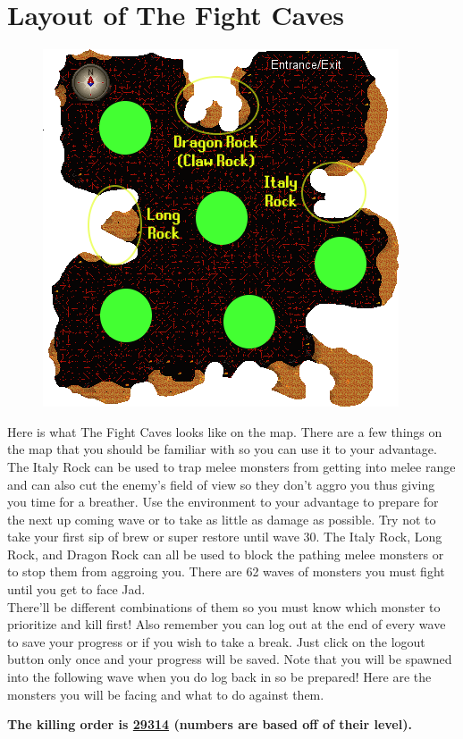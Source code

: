 \documentclass{article}
\begin{document}
\section{Layout of The Fight Caves}
\begin{figure}
\includegraphics[width=.6\textwidth]{Fight_Caves_Map.png}
\end{figure}
Here is what The Fight Caves looks like on the map. There are a few things on the map that you should be familiar with so you can use it to your advantage. The Italy Rock can be used to trap melee monsters from getting into melee range and can also cut the enemy's field of view so they don't aggro you thus giving you time for a breather. Use the environment to your advantage to prepare for the next up coming wave or to take as little as damage as possible. Try not to take your first sip of brew or super restore until wave 30. The Italy Rock, Long Rock, and Dragon Rock can all be used to block the pathing melee monsters or to stop them from aggroing you.
There are 62 waves of monsters you must fight until you get to face Jad.
\\There'll be different combinations of them so you must know which monster to prioritize and kill first! Also remember you can log out at the end of every wave to save your progress or if you wish to take a break. Just click on the logout button only once and your progress will be saved. Note that you will be spawned into the following wave when you do log back in so be prepared! Here are the monsters you will be facing and what to do against them.
\newpage

\textbf{The killing order is \underline{29314} (numbers are based off of their level). }
\end{document}
